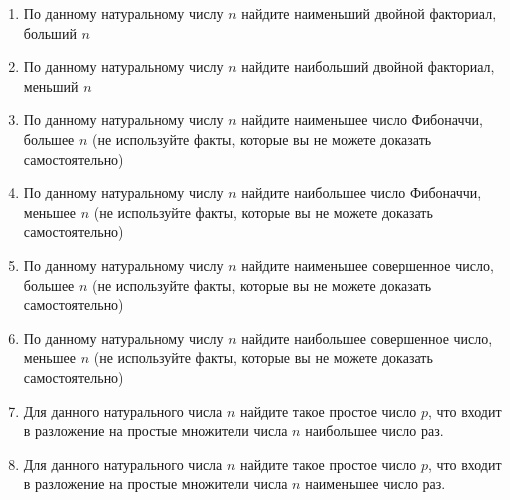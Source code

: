 \begin{enumerate}
	\item По данному натуральному числу $n$ найдите наименьший двойной факториал, больший $n$
	\item По данному натуральному числу $n$ найдите наибольший двойной факториал, меньший $n$
	\item По данному натуральному числу $n$ найдите наименьшее число Фибоначчи, большее $n$ (не используйте факты, которые вы не можете доказать самостоятельно)
	\item По данному натуральному числу $n$ найдите наибольшее число Фибоначчи, меньшее $n$ (не используйте факты, которые вы не можете доказать самостоятельно)
	\item По данному натуральному числу $n$ найдите наименьшее совершенное число, большее $n$ (не используйте факты, которые вы не можете доказать самостоятельно)
	\item По данному натуральному числу $n$ найдите наибольшее совершенное число, меньшее $n$ (не используйте факты, которые вы не можете доказать самостоятельно)
	\item Для данного натурального числа $n$ найдите такое простое число $p$, что входит в разложение на простые множители числа $n$ наибольшее число
		раз.
	\item Для данного натурального числа $n$ найдите такое простое число $p$, что входит в разложение на простые множители числа $n$ наименьшее число
		раз.
\end{enumerate}